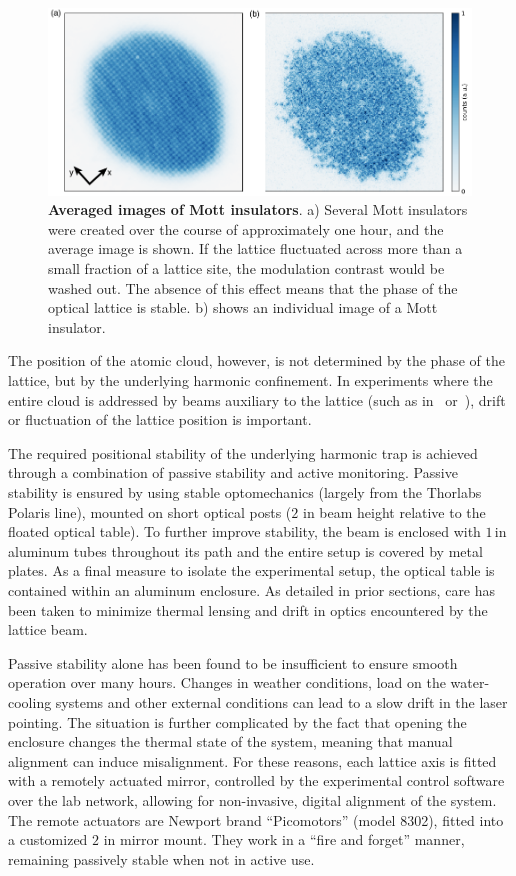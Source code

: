 \documentclass[twocolumn,aps,pra,showpacs,preprintnumbers,bibnotes]{revtex4-1}
\begin{document}
\begin{figure}
  \begin{center}
    \includegraphics{Figure12.pdf}
    \caption{\textbf{Averaged images of Mott insulators}. a) Several Mott insulators were created over the course of approximately one hour, and the average image is shown\cite{Greif2016}. If the lattice fluctuated across more than a small fraction of a lattice site, the modulation contrast would be washed out. The absence of this effect means that the phase of the optical lattice is stable. b) shows an individual image of a Mott insulator.}\label{fig:averaged_mott}
  \end{center}
\end{figure}


The position of the atomic cloud, however, is not determined by the phase of the lattice, but by the underlying harmonic confinement.
In experiments where the entire cloud is addressed by beams auxiliary to the lattice (such as in~\cite{Mazurenko2016} or~\cite{Choi2016}), drift or fluctuation of the lattice position is important.

The required positional stability of the underlying harmonic trap is achieved through a combination of passive stability and active monitoring.
Passive stability is ensured by using stable optomechanics (largely from the Thorlabs Polaris line), mounted on short optical posts ($2$ in beam height relative to the floated optical table).
To further improve stability, the beam is enclosed with $1\,$in aluminum tubes throughout its path and the entire setup is covered by metal plates.
As a final measure to isolate the experimental setup, the optical table is contained within an aluminum enclosure. As detailed in prior sections, care has been taken to minimize thermal lensing and drift in optics encountered by the lattice beam.

Passive stability alone has been found to be insufficient to ensure smooth operation over many hours. Changes in weather conditions, load on the water-cooling systems and other external conditions can lead to a slow drift in the laser pointing.
The situation is further complicated by the fact that opening the enclosure changes the thermal state of the system, meaning that manual alignment can induce misalignment.
For these reasons, each lattice axis is fitted with a remotely actuated mirror, controlled by the experimental control software over the lab network, allowing for non-invasive, digital alignment of the system.
The remote actuators are Newport brand ``Picomotors'' (model 8302), fitted into a customized $2$ in mirror mount.
They work in a ``fire and forget'' manner, remaining passively stable when not in active use.
\end{document}

